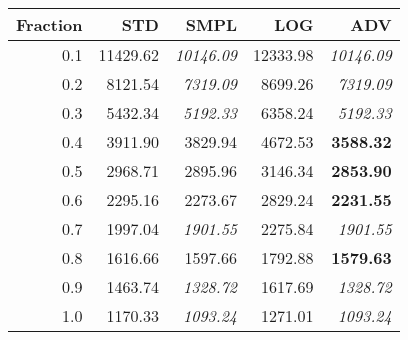 \documentclass{standalone}
\begin{document}
\begin{tabular}{r|rrrr}
      \toprule
      Fraction & STD & SMPL & LOG & ADV\\
      \midrule
      0.1 & 11429.62 & \emph{10146.09} & 12333.98 & \emph{10146.09}\\
  0.2 & 8121.54 & \emph{7319.09} & 8699.26 & \emph{7319.09}\\
  0.3 & 5432.34 & \emph{5192.33} & 6358.24 & \emph{5192.33}\\
  0.4 & 3911.90 & 3829.94 & 4672.53 & \textbf{3588.32}\\
  0.5 & 2968.71 & 2895.96 & 3146.34 & \textbf{2853.90}\\
  0.6 & 2295.16 & 2273.67 & 2829.24 & \textbf{2231.55}\\
  0.7 & 1997.04 & \emph{1901.55} & 2275.84 & \emph{1901.55}\\
  0.8 & 1616.66 & 1597.66 & 1792.88 & \textbf{1579.63}\\
  0.9 & 1463.74 & \emph{1328.72} & 1617.69 & \emph{1328.72}\\
  1.0 & 1170.33 & \emph{1093.24} & 1271.01 & \emph{1093.24}\\
  \bottomrule
\end{tabular}
\end{document}
